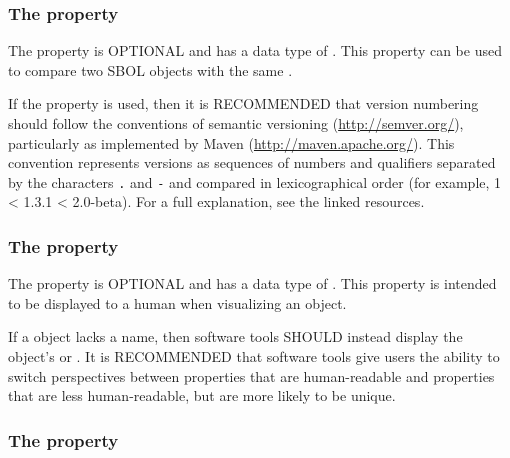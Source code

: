 
\subsubsection*{The  property}
\label{sec:version}

The  property is OPTIONAL and has a data type of . This property can be used to compare two SBOL objects with the same .

If the  property is used, then it is RECOMMENDED that version numbering should follow the conventions of semantic versioning (\url{http://semver.org/}), particularly as implemented by Maven (\url{http://maven.apache.org/}).
This convention represents versions as sequences of numbers and qualifiers separated by the characters {\tt .} and {\tt -} and compared in lexicographical order (for example, 1 < 1.3.1 < 2.0-beta).
For a full explanation, see the linked resources.

\subsubsection*{The  property}
\label{sec:name}



The  property is OPTIONAL and has a data type of . This property is intended to be displayed to a human when visualizing an  object.

If a  object lacks a name, then software tools SHOULD instead display the object's  or .
It is RECOMMENDED that software tools give users the ability to switch perspectives between  properties that are human-readable and  properties that are less human-readable, but are more likely to be unique.

\subsubsection*{The  property}
\label{sec:description}

